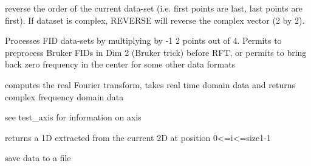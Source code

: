 \documentclass[letterpaper,10pt,openany,oneside]{sphinxmanual}
\begin{document}
\begin{fulllineitems}

\begin{fulllineitems}
\label{rst/code:NPKData.NPKData.reverse}
reverse the order of the current data-set (i.e. first points are 
last, last points are first).
If dataset is complex, REVERSE will reverse the complex  vector (2  by 2).

\end{fulllineitems}


\begin{fulllineitems}
\label{rst/code:NPKData.NPKData.revf}
Processes FID data-sets by multiplying by -1 2 points out of 4. 
Permits to preprocess Bruker FIDs in Dim 2 (Bruker trick) before 
RFT, or permits to bring back zero frequency in the center for some 
other data formats

\end{fulllineitems}


\begin{fulllineitems}
\label{rst/code:NPKData.NPKData.rfft}
computes the real Fourier transform,
takes real time domain data and returns complex frequency domain data

see test\_axis for information on axis

\end{fulllineitems}


\begin{fulllineitems}
\label{rst/code:NPKData.NPKData.row}
returns a 1D extracted from the current 2D at position 0\textless{}=i\textless{}=size1-1

\end{fulllineitems}


\begin{fulllineitems}
\label{rst/code:NPKData.NPKData.save}
save data to a file

\end{fulllineitems}


\end{fulllineitems}
\end{document}
